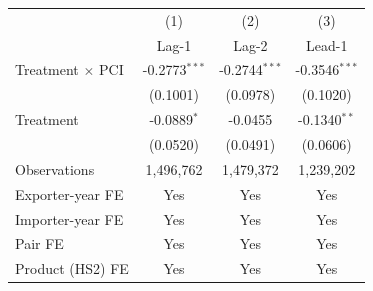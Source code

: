\begin{tabular}{lccc}
\toprule
 & (1) & (2) & (3) \\
 & Lag-1 & Lag-2 & Lead-1 \\
\midrule
Treatment $\times$ PCI & -0.2773$^{***}$ & -0.2744$^{***}$ & -0.3546$^{***}$ \\
 & (0.1001) & (0.0978) & (0.1020) \\
Treatment & -0.0889$^{*}$ & -0.0455 & -0.1340$^{**}$ \\
 & (0.0520) & (0.0491) & (0.0606) \\
\midrule
Observations & 1,496,762 & 1,479,372 & 1,239,202 \\
Exporter-year FE & Yes & Yes & Yes \\
Importer-year FE & Yes & Yes & Yes \\
Pair FE & Yes & Yes & Yes \\
Product (HS2) FE & Yes & Yes & Yes \\
\bottomrule
\end{tabular}